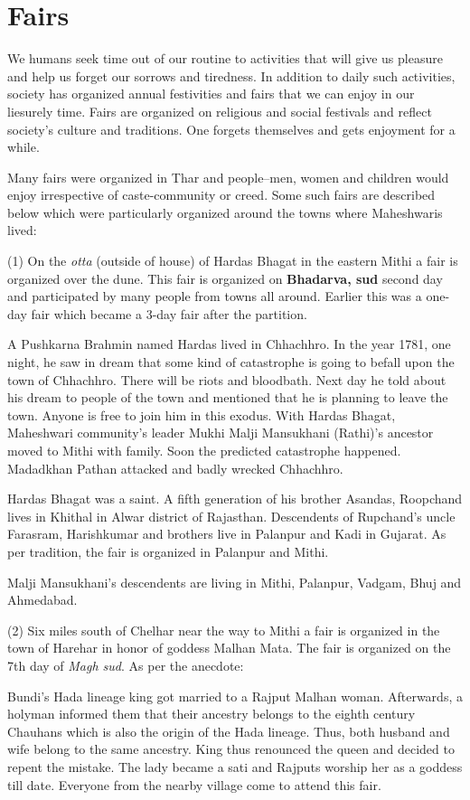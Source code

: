 \chapter{Fairs}
We humans seek time out of our routine to activities that will give us pleasure
and help us forget our sorrows and tiredness. In addition to daily such
activities, society has organized annual festivities and fairs that we can
enjoy in our liesurely time. Fairs are organized on religious and social
festivals and reflect society's culture and traditions. One forgets themselves
and gets enjoyment for a while.

Many fairs were organized in Thar and people--men, women and children would
enjoy irrespective of caste-community or creed. Some such fairs are described
below which were particularly organized around the towns where Maheshwaris
lived:

(1) On the \textit{otta} (outside of house) of Hardas Bhagat in the eastern
Mithi a fair is organized over the dune. This fair is organized on
\textbf{Bhadarva, sud} second day and participated by many people from towns
all around. Earlier this was a one-day fair which became a 3-day fair after the
partition.

A Pushkarna Brahmin named Hardas lived in Chhachhro. In the year 1781, one
night, he saw in dream that some kind of catastrophe is going to befall upon
the town of Chhachhro. There will be riots and bloodbath. Next day he told
about his dream to people of the town and mentioned that he is planning to
leave the town. Anyone is free to join him in this exodus. With Hardas Bhagat,
Maheshwari community's leader Mukhi Malji Mansukhani (Rathi)'s ancestor moved
to Mithi with family. Soon the predicted catastrophe happened. Madadkhan Pathan
attacked and badly wrecked Chhachhro.

Hardas Bhagat was a saint. A fifth generation of his brother Asandas, Roopchand
lives in Khithal in Alwar district of Rajasthan. Descendents of Rupchand's
uncle Farasram, Harishkumar and brothers live in Palanpur and Kadi in Gujarat.
As per tradition, the fair is organized in Palanpur and Mithi.

Malji Mansukhani's descendents are living in Mithi, Palanpur, Vadgam, Bhuj and
Ahmedabad.

(2) Six miles south of Chelhar near the way to Mithi a fair is organized in the
town of Harehar in honor of goddess Malhan Mata. The fair is organized on the
7th day of \textit{Magh sud}. As per the anecdote:

Bundi's Hada lineage king got married to a Rajput Malhan woman. Afterwards, a
holyman informed them that their ancestry belongs to the eighth century
Chauhans which is also the origin of the Hada lineage. Thus, both husband and
wife belong to the same ancestry. King thus renounced the queen and decided to
repent the mistake. The lady became a sati and Rajputs worship her as a goddess
till date. Everyone from the nearby village come to attend this fair.

